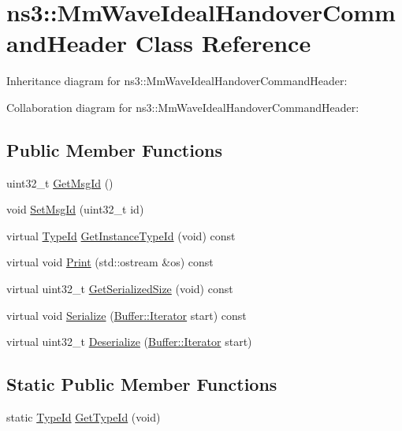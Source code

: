\hypertarget{classns3_1_1MmWaveIdealHandoverCommandHeader}{}\section{ns3\+:\+:Mm\+Wave\+Ideal\+Handover\+Command\+Header Class Reference}
\label{classns3_1_1MmWaveIdealHandoverCommandHeader}


Inheritance diagram for ns3\+:\+:Mm\+Wave\+Ideal\+Handover\+Command\+Header\+:


Collaboration diagram for ns3\+:\+:Mm\+Wave\+Ideal\+Handover\+Command\+Header\+:
\subsection*{Public Member Functions}
\begin{DoxyCompactItemize}
\item 
uint32\+\_\+t \hyperlink{classns3_1_1MmWaveIdealHandoverCommandHeader_a0de0274e081b78f4e0ca630fdf60ebf4}{Get\+Msg\+Id} ()
\item 
void \hyperlink{classns3_1_1MmWaveIdealHandoverCommandHeader_a297d31def450b15e3200ecd3837c6477}{Set\+Msg\+Id} (uint32\+\_\+t id)
\item 
virtual \hyperlink{classns3_1_1TypeId}{Type\+Id} \hyperlink{classns3_1_1MmWaveIdealHandoverCommandHeader_a8b59875a6b8c59eeb8755815d1579826}{Get\+Instance\+Type\+Id} (void) const 
\item 
virtual void \hyperlink{classns3_1_1MmWaveIdealHandoverCommandHeader_a5f47c593ceee305f13b2f5700ecf4fa3}{Print} (std\+::ostream \&os) const 
\item 
virtual uint32\+\_\+t \hyperlink{classns3_1_1MmWaveIdealHandoverCommandHeader_a5809dbfb575055d14f8e5226c3fa1958}{Get\+Serialized\+Size} (void) const 
\item 
virtual void \hyperlink{classns3_1_1MmWaveIdealHandoverCommandHeader_a024ee824c2e64d5a2870d0886ed9f659}{Serialize} (\hyperlink{classns3_1_1Buffer_1_1Iterator}{Buffer\+::\+Iterator} start) const 
\item 
virtual uint32\+\_\+t \hyperlink{classns3_1_1MmWaveIdealHandoverCommandHeader_a757a7e03bf1a3d35bd97bb9f1c689d7c}{Deserialize} (\hyperlink{classns3_1_1Buffer_1_1Iterator}{Buffer\+::\+Iterator} start)
\end{DoxyCompactItemize}
\subsection*{Static Public Member Functions}
\begin{DoxyCompactItemize}
\item 
static \hyperlink{classns3_1_1TypeId}{Type\+Id} \hyperlink{classns3_1_1MmWaveIdealHandoverCommandHeader_af4f528923d831b32b477974d3a2a6350}{Get\+Type\+Id} (void)
\end{DoxyCompactItemize}
